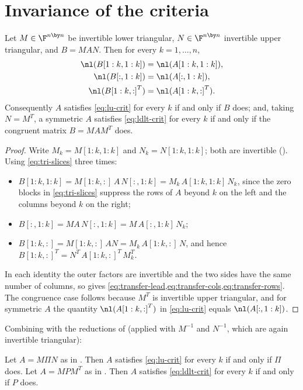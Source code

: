 \section{Invariance of the criteria}\label{sec:transfer}

\begin{lemma}[transfer]\label{lem:transfer}
  Let $M \in \F^{n \by n}$ be invertible lower triangular, $N \in
  \F^{n \by n}$ invertible upper triangular, and $B = M A N$.  Then for
  every $k = 1, \ldots, n$,
  \begin{align}
    \nl(B[1:k,1:k]) &= \nl(A[1:k,1:k]), \label{eq:transfer-lead}\\
    \nl(B[:,1:k]) &= \nl(A[:,1:k]), \label{eq:transfer-cols}\\
    \nl({B[1:k,:]}^T) &= \nl({A[1:k,:]}^T). \label{eq:transfer-rows}
  \end{align}
  Consequently $A$ satisfies \cref{eq:lu-crit} for every $k$ if and only if
  $B$ does; and, taking $N = M^T$, a symmetric $A$ satisfies
  \cref{eq:ldlt-crit} for every $k$ if and only if the congruent matrix
  $B = M A M^T$ does.
\end{lemma}

\begin{proof}
  Write $M_k = M[1:k,1:k]$ and $N_k = N[1:k,1:k]$; both are invertible
  ().  Using \cref{eq:tri-slices} three times:
  \begin{itemize}
    \item $B[1:k,1:k] = M[1:k,:] \, A \, N[:,1:k]
      = M_k \, A[1:k,1:k] \, N_k$, since the zero blocks in
      \cref{eq:tri-slices} suppress the rows of $A$ beyond $k$ on the left
      and the columns beyond $k$ on the right;
    \item $B[:,1:k] = M A \, N[:,1:k] = M \, A[:,1:k] \, N_k$;
    \item $B[1:k,:] = M[1:k,:] \, A N = M_k \, A[1:k,:] \, N$, and hence
      ${B[1:k,:]}^T = N^T \, {A[1:k,:]}^T \, M_k^T$.
  \end{itemize}
  In each identity the outer factors are invertible and the two sides have
  the same number of columns, so  gives
  \cref{eq:transfer-lead,eq:transfer-cols,eq:transfer-rows}.  The
  congruence case follows because $M^T$ is invertible upper triangular, and
  for symmetric $A$ the quantity $\nl({A[1:k,:]}^T)$ in \cref{eq:lu-crit}
  equals $\nl(A[:,1:k])$.
\end{proof}

Combining  with the reductions of
 (applied with $M^{-1}$ and $N^{-1}$, which are again
invertible triangular):

\begin{corollary}\label{cor:transfer-to-normal}
  Let $A = M \Pi N$ as in .  Then $A$ satisfies
  \cref{eq:lu-crit} for every $k$ if and only if $\Pi$ does.  Let
  $A = M P M^T$ as in .  Then $A$ satisfies
  \cref{eq:ldlt-crit} for every $k$ if and only if $P$ does.
\end{corollary}
